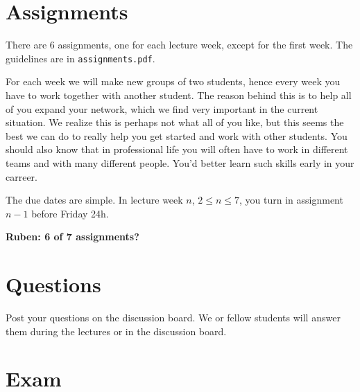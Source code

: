 \documentclass[a4paper]{article}
\theoremstyle{definition}
\newcommand{\1}[1]{\,I_{#1}} %
\newcommand{\nvf}[1]{\textbf{#1}}
\begin{document}
\section{Assignments}
\label{sec:org99ab755}
There are 6 assignments, one for each lecture week, except for the first week. The guidelines are in \texttt{assignments.pdf}.

For each week we will make new groups of two students, hence every week you have to work together with another student.
The reason behind this is to help all of you expand your network, which we find very important in the current situation.
We realize this is perhaps not what all of you like, but this seems the best we can do to really help you get started and work with other students.
You should also know that in professional life you will often have to work in different teams and with many different people.
You'd better learn such skills early in your carreer.

The due dates are  simple. In lecture week \(n\), \(2\leq n\leq 7\), you turn in assignment \(n-1\) before Friday 24h. 

\nvf{Ruben: 6 of 7 assignments?}

\section{Questions}
\label{sec:org34422c0}

Post your questions on the discussion board.
We or fellow students will answer them during the lectures or in the discussion board.

\section{Exam}
\label{sec:org549060b}
\end{document}
